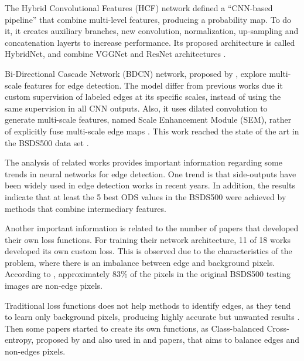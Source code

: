 The Hybrid Convolutional Features (HCF) network \cite{LearningHybrid:Hu2018377} defined a ``CNN-based pipeline'' that combine multi-level features, producing a probability map.
To do it, it creates auxiliary branches, new convolution, normalization, up-sampling and concatenation layerts to increase performance.
Its proposed architecture is called HybridNet, and combine VGGNet and ResNet architectures \cite{LearningHybrid:Hu2018377}.

Bi-Directional Cascade Network (BDCN) network, proposed by \cite{He:2019}, explore multi-scale features for edge detection.
The model differ from previous works due it custom supervision of labeled edges at its specific scales, instead of using the same supervision in all CNN outputs.
Also, it uses dilated convolution to generate multi-scale features, named Scale Enhancement Module (SEM), rather of explicitly fuse multi-scale edge maps \cite{He:2019}.
This work reached the state of the art in the BSDS500 data set \cite{Silberman:ECCV12}. %

%

The analysis of related works provides important information regarding some trends in neural networks for edge detection.
One trend is that side-outputs have been widely used in edge detection works in recent years.
In addition, the results indicate that at least the 5 best ODS values in the BSDS500 were achieved by methods that combine intermediary features.

Another important information is related to the number of papers that developed their own loss functions.
For training their network architecture, 11 of 18 works developed its own custom loss.
This is observed due to the characteristics of the problem, where there is an imbalance between edge and background pixels.
According to \cite{ReExtraction:Wen201884}, approximately 83\% of the pixels in the original BSDS500 testing images are non-edge pixels.

Traditional loss functions does not help methods to identify edges, as they tend to learn only background pixels, producing highly accurate but unwanted results \cite{Xie:2017:HED:3158436.3158453}.
Then some papers started to create its own functions, as Class-balanced Cross-entropy, proposed by \cite{Xie:2017:HED:3158436.3158453} and also used in \cite{Cumulative:Song20181847} and \cite{CrispBoundaries:2018:Deng2018570} papers, that aims to balance edges and non-edges pixels.

